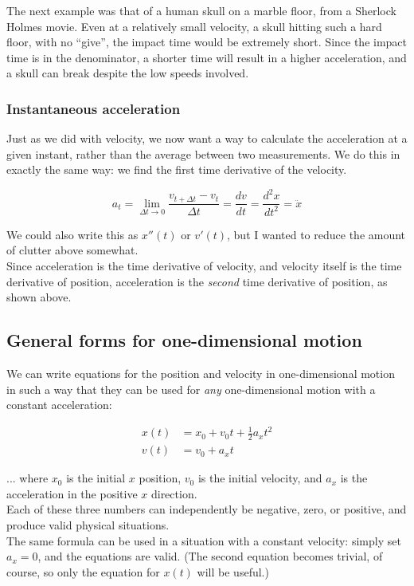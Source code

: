 \documentclass[12pt,a4paper]{report}
\begin{document}
The next example was that of a human skull on a marble floor, from a Sherlock Holmes movie. Even at a relatively small velocity, a skull hitting such a hard floor, with no ``give'', the impact time would be extremely short. Since the impact time is in the denominator, a shorter time will result in a higher acceleration, and a skull can break despite the low speeds involved. 

\subsubsection{Instantaneous acceleration}

Just as we did with velocity, we now want a way to calculate the acceleration at a given instant, rather than the average between two measurements. We do this in exactly the same way: we find the first time derivative of the velocity.

\begingroup
\large
\begin{equation}
 a_t = \lim_{\Delta t \to 0} \frac{v_{t + \Delta t} - v_t}{\Delta t} = \frac{dv}{dt} = \frac{d^2x}{dt^2} = \ddot{x}
\end{equation}
\endgroup

We could also write this as $x''(t)$ or $v'(t)$, but I wanted to reduce the amount of clutter above somewhat.\\
Since acceleration is the time derivative of velocity, and velocity itself is the time derivative of position, acceleration is the \emph{second} time derivative of position, as shown above.

\subsection{General forms for one-dimensional motion}

We can write equations for the position and velocity in one-dimensional motion in such a way that they can be used for \emph{any} one-dimensional motion with a constant acceleration:

\begin{align}
x(t) &= x_0 + v_0 t + \frac{1}{2} a_x t^2\\
v(t) &= v_0 + a_x t
\end{align}

... where $x_0$ is the initial $x$ position, $v_0$ is the initial velocity, and $a_x$ is the acceleration in the positive $x$ direction.\\
Each of these three numbers can independently be negative, zero, or positive, and produce valid physical situations.\\
The same formula can be used in a situation with a constant velocity: simply set $a_x = 0$, and the equations are valid. (The second equation becomes trivial, of course, so only the equation for $x(t)$ will be useful.)
\end{document}
